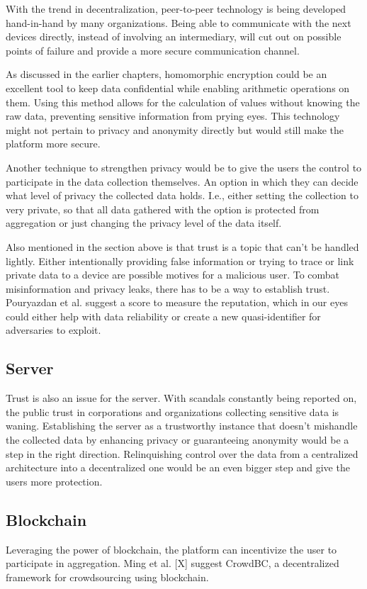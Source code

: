 With the trend in decentralization, peer-to-peer technology is being developed hand-in-hand by many organizations. Being able to communicate with the next devices directly, instead of involving an intermediary, will cut out on possible points of failure and provide a more secure communication channel.

As discussed in the earlier chapters, homomorphic encryption could be an excellent tool to keep data confidential while enabling arithmetic operations on them. Using this method allows for the calculation of values without knowing the raw data, preventing sensitive information from prying eyes. This technology might not pertain to privacy and anonymity directly but would still make the platform more secure.

Another technique to strengthen privacy would be to give the users the control to participate in the data collection themselves. An option in which they can decide what level of privacy the collected data holds. I.e., either setting the collection to very private, so that all data gathered with the option is protected from aggregation or just changing the privacy level of the data itself.

Also mentioned in the section above is that trust is a topic that can't be handled lightly. Either intentionally providing false information or trying to trace or link private data to a device are possible motives for a malicious user. To combat misinformation and privacy leaks, there has to be a way to establish trust. Pouryazdan et al. \cite{DBLP:journals/access/PouryazdanKSFS17} suggest a score to measure the reputation, which in our eyes could either help with data reliability or create a new quasi-identifier for adversaries to exploit.
 
\subsection{Server}
Trust is also an issue for the server. With scandals constantly being reported on, the public trust in corporations and organizations collecting sensitive data is waning. Establishing the server as a trustworthy instance that doesn't mishandle the collected data by enhancing privacy or guaranteeing anonymity would be a step in the right direction. Relinquishing control over the data from a centralized architecture into a decentralized one would be an even bigger step and give the users more protection.

\subsection{Blockchain}
Leveraging the power of blockchain, the platform can incentivize the user to participate in aggregation. Ming et al. [X] suggest CrowdBC, a decentralized framework for crowdsourcing using blockchain. 

